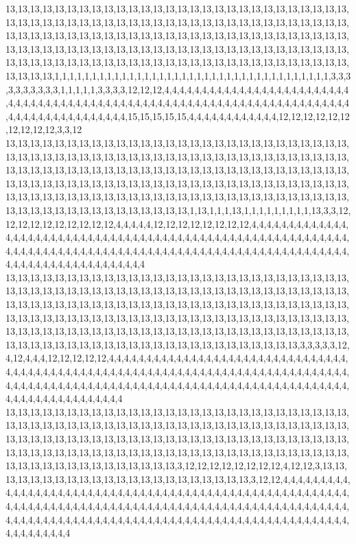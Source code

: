 13,13,13,13,13,13,13,13,13,13,13,13,13,13,13,13,13,13,13,13,13,13,13,13,13,13,13,13,13,13,13,13,13,13,13,13,13,13,13,13,13,13,13,13,13,13,13,13,13,13,13,13,13,13,13,13,13,13,13,13,13,13,13,13,13,13,13,13,13,13,13,13,13,13,13,13,13,13,13,13,13,13,13,13,13,13,13,13,13,13,13,13,13,13,13,13,13,13,13,13,13,13,13,13,13,13,13,13,13,13,13,13,13,13,13,13,13,13,13,13,13,13,13,13,13,13,13,13,13,13,13,13,13,13,13,13,13,13,13,13,13,13,13,13,1,1,1,1,1,1,1,1,1,1,1,1,1,1,1,1,1,1,1,1,1,1,1,1,1,1,1,1,1,1,1,1,1,1,1,1,1,3,3,3,3,3,3,3,3,3,3,1,1,1,1,1,3,3,3,3,12,12,12,4,4,4,4,4,4,4,4,4,4,4,4,4,4,4,4,4,4,4,4,4,4,4,4,4,4,4,4,4,4,4,4,4,4,4,4,4,4,4,4,4,4,4,4,4,4,4,4,4,4,4,4,4,4,4,4,4,4,4,4,4,4,4,4,4,4,4,4,4,4,4,4,4,4,4,4,4,4,4,4,4,4,4,4,4,4,4,15,15,15,15,15,4,4,4,4,4,4,4,4,4,4,4,4,12,12,12,12,12,12,12,12,12,12,3,3,12
13,13,13,13,13,13,13,13,13,13,13,13,13,13,13,13,13,13,13,13,13,13,13,13,13,13,13,13,13,13,13,13,13,13,13,13,13,13,13,13,13,13,13,13,13,13,13,13,13,13,13,13,13,13,13,13,13,13,13,13,13,13,13,13,13,13,13,13,13,13,13,13,13,13,13,13,13,13,13,13,13,13,13,13,13,13,13,13,13,13,13,13,13,13,13,13,13,13,13,13,13,13,13,13,13,13,13,13,13,13,13,13,13,13,13,13,13,13,13,13,13,13,13,13,13,13,13,13,13,13,13,13,13,13,13,13,13,13,13,13,13,13,13,13,13,13,13,13,13,13,13,13,13,13,13,1,13,1,1,1,13,1,1,1,1,1,1,1,1,1,13,3,3,12,12,12,12,12,12,12,12,12,12,4,4,4,4,4,12,12,12,12,12,12,12,12,4,4,4,4,4,4,4,4,4,4,4,4,4,4,4,4,4,4,4,4,4,4,4,4,4,4,4,4,4,4,4,4,4,4,4,4,4,4,4,4,4,4,4,4,4,4,4,4,4,4,4,4,4,4,4,4,4,4,4,4,4,4,4,4,4,4,4,4,4,4,4,4,4,4,4,4,4,4,4,4,4,4,4,4,4,4,4,4,4,4,4,4,4,4,4,4,4,4,4,4,4,4,4,4,4,4,4,4,4,4,4,4,4,4,4,4,4,4,4,4,4,4,4,4
13,13,13,13,13,13,13,13,13,13,13,13,13,13,13,13,13,13,13,13,13,13,13,13,13,13,13,13,13,13,13,13,13,13,13,13,13,13,13,13,13,13,13,13,13,13,13,13,13,13,13,13,13,13,13,13,13,13,13,13,13,13,13,13,13,13,13,13,13,13,13,13,13,13,13,13,13,13,13,13,13,13,13,13,13,13,13,13,13,13,13,13,13,13,13,13,13,13,13,13,13,13,13,13,13,13,13,13,13,13,13,13,13,13,13,13,13,13,13,13,13,13,13,13,13,13,13,13,13,13,13,13,13,13,13,13,13,13,13,13,13,13,13,13,13,13,13,13,13,13,13,13,13,13,13,13,13,13,13,13,13,13,13,13,3,3,3,3,3,12,4,12,4,4,4,12,12,12,12,12,4,4,4,4,4,4,4,4,4,4,4,4,4,4,4,4,4,4,4,4,4,4,4,4,4,4,4,4,4,4,4,4,4,4,4,4,4,4,4,4,4,4,4,4,4,4,4,4,4,4,4,4,4,4,4,4,4,4,4,4,4,4,4,4,4,4,4,4,4,4,4,4,4,4,4,4,4,4,4,4,4,4,4,4,4,4,4,4,4,4,4,4,4,4,4,4,4,4,4,4,4,4,4,4,4,4,4,4,4,4,4,4,4,4,4,4,4,4,4,4,4,4,4,4,4,4,4,4,4,4,4,4,4,4,4,4,4,4,4,4
13,13,13,13,13,13,13,13,13,13,13,13,13,13,13,13,13,13,13,13,13,13,13,13,13,13,13,13,13,13,13,13,13,13,13,13,13,13,13,13,13,13,13,13,13,13,13,13,13,13,13,13,13,13,13,13,13,13,13,13,13,13,13,13,13,13,13,13,13,13,13,13,13,13,13,13,13,13,13,13,13,13,13,13,13,13,13,13,13,13,13,13,13,13,13,13,13,13,13,13,13,13,13,13,13,13,13,13,13,13,13,13,13,13,13,13,13,13,13,13,13,13,13,13,13,13,3,12,12,12,12,12,12,12,12,4,12,12,3,13,13,13,13,13,13,13,13,13,13,13,13,13,13,13,13,13,13,13,13,13,13,3,12,12,4,4,4,4,4,4,4,4,4,4,4,4,4,4,4,4,4,4,4,4,4,4,4,4,4,4,4,4,4,4,4,4,4,4,4,4,4,4,4,4,4,4,4,4,4,4,4,4,4,4,4,4,4,4,4,4,4,4,4,4,4,4,4,4,4,4,4,4,4,4,4,4,4,4,4,4,4,4,4,4,4,4,4,4,4,4,4,4,4,4,4,4,4,4,4,4,4,4,4,4,4,4,4,4,4,4,4,4,4,4,4,4,4,4,4,4,4,4,4,4,4,4,4,4,4,4,4,4,4,4,4,4,4,4,4,4,4,4,4,4,4,4,4,4,4,4,4,4,4,4,4,4,4,4,4,4
